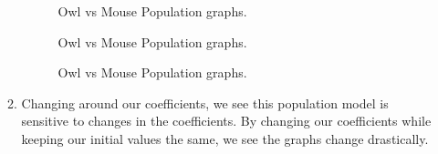 \documentclass[12pt,letterpaper]{article}
\begin{document}
\begin{enumerate}
\begin{enumerate}
\begin{figure}[!htb]
      \caption{\label{fig:4} Owl vs Mouse Population graphs.}
    \end{figure}
    \begin{figure}[!htb]
      \caption{\label{fig:5} Owl vs Mouse Population graphs.}
    \end{figure}
    \begin{figure}[!htb]
      \caption{\label{fig:6} Owl vs Mouse Population graphs.}
    \end{figure}
    \pagebreak
  \item Changing around our coefficients, we see this population model is sensitive to 
  changes in the coefficients. By changing our coefficients while keeping our initial 
  values the same, we see the graphs change drastically. 
\end{enumerate}


\end{enumerate}
\end{document}
